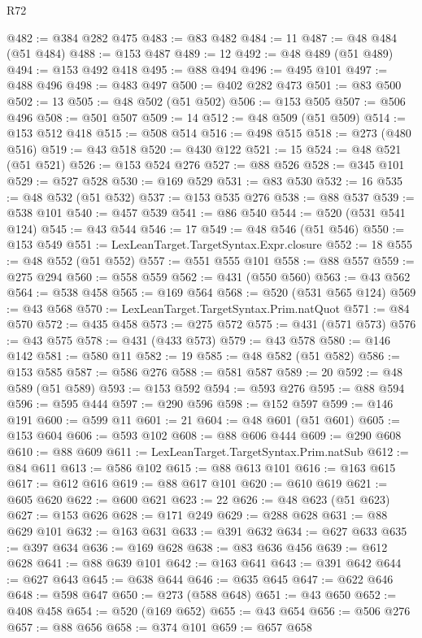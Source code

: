 \begin{lexlean}{R72}
\begin{coremodule}
@482 := @384 @282 @475
@483 := @83 @482
@484 := 11
@487 := @48 @484 (@51 @484)
@488 := @153 @487
@489 := 12
@492 := @48 @489 (@51 @489)
@494 := @153 @492 @418
@495 := @88 @494
@496 := @495 @101
@497 := @488 @496
@498 := @483 @497
@500 := @402 @282 @473
@501 := @83 @500
@502 := 13
@505 := @48 @502 (@51 @502)
@506 := @153 @505
@507 := @506 @496
@508 := @501 @507
@509 := 14
@512 := @48 @509 (@51 @509)
@514 := @153 @512 @418
@515 := @508 @514
@516 := @498 @515
@518 := @273 (@480 @516)
@519 := @43 @518
@520 := @430 @122
@521 := 15
@524 := @48 @521 (@51 @521)
@526 := @153 @524 @276
@527 := @88 @526
@528 := @345 @101
@529 := @527 @528
@530 := @169 @529
@531 := @83 @530
@532 := 16
@535 := @48 @532 (@51 @532)
@537 := @153 @535 @276
@538 := @88 @537
@539 := @538 @101
@540 := @457 @539
@541 := @86 @540
@544 := @520 (@531 @541 @124)
@545 := @43 @544
@546 := 17
@549 := @48 @546 (@51 @546)
@550 := @153 @549
@551 := LexLeanTarget.TargetSyntax.Expr.closure
@552 := 18
@555 := @48 @552 (@51 @552)
@557 := @551 @555 @101
@558 := @88 @557
@559 := @275 @294
@560 := @558 @559
@562 := @431 (@550 @560)
@563 := @43 @562
@564 := @538 @458
@565 := @169 @564
@568 := @520 (@531 @565 @124)
@569 := @43 @568
@570 := LexLeanTarget.TargetSyntax.Prim.natQuot
@571 := @84 @570
@572 := @435 @458
@573 := @275 @572
@575 := @431 (@571 @573)
@576 := @43 @575
@578 := @431 (@433 @573)
@579 := @43 @578
@580 := @146 @142
@581 := @580 @11
@582 := 19
@585 := @48 @582 (@51 @582)
@586 := @153 @585
@587 := @586 @276
@588 := @581 @587
@589 := 20
@592 := @48 @589 (@51 @589)
@593 := @153 @592
@594 := @593 @276
@595 := @88 @594
@596 := @595 @444
@597 := @290 @596
@598 := @152 @597
@599 := @146 @191
@600 := @599 @11
@601 := 21
@604 := @48 @601 (@51 @601)
@605 := @153 @604
@606 := @593 @102
@608 := @88 @606 @444
@609 := @290 @608
@610 := @88 @609
@611 := LexLeanTarget.TargetSyntax.Prim.natSub
@612 := @84 @611
@613 := @586 @102
@615 := @88 @613 @101
@616 := @163 @615
@617 := @612 @616
@619 := @88 @617 @101
@620 := @610 @619
@621 := @605 @620
@622 := @600 @621
@623 := 22
@626 := @48 @623 (@51 @623)
@627 := @153 @626
@628 := @171 @249
@629 := @288 @628
@631 := @88 @629 @101
@632 := @163 @631
@633 := @391 @632
@634 := @627 @633
@635 := @397 @634
@636 := @169 @628
@638 := @83 @636 @456
@639 := @612 @628
@641 := @88 @639 @101
@642 := @163 @641
@643 := @391 @642
@644 := @627 @643
@645 := @638 @644
@646 := @635 @645
@647 := @622 @646
@648 := @598 @647
@650 := @273 (@588 @648)
@651 := @43 @650
@652 := @408 @458
@654 := @520 (@169 @652)
@655 := @43 @654
@656 := @506 @276
@657 := @88 @656
@658 := @374 @101
@659 := @657 @658

\end{coremodule}
\end{lexlean}
